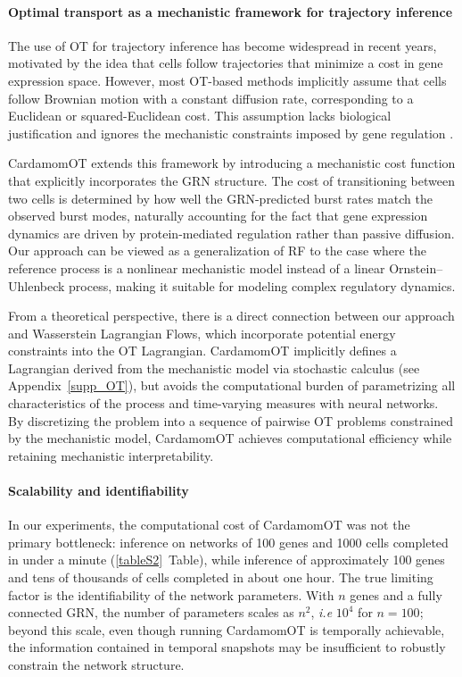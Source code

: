 \documentclass[a4paper, 11pt]{article}
\theoremstyle{plain}
\theoremstyle{remark}
\newcommand*{\firstreview}[1]{{\color{black}#1}}
\begin{document}
\paragraph{Optimal transport as a mechanistic framework for trajectory inference}
The use of \firstreview{OT} for trajectory inference has become widespread in recent years, motivated by the idea that cells follow trajectories that minimize a cost in gene expression space. However, most OT-based methods implicitly assume that cells follow Brownian motion with a constant diffusion rate, corresponding to a Euclidean or squared-Euclidean cost. This assumption lacks biological justification and ignores the mechanistic constraints imposed by gene regulation \cite{fournie2025cell}.

CardamomOT extends this framework by introducing a mechanistic cost function that explicitly incorporates the GRN structure. The cost of transitioning between two cells is determined by how well the GRN-predicted burst rates match the observed burst modes, naturally accounting for the fact that gene expression dynamics are driven by protein-mediated regulation rather than passive diffusion. Our approach can be viewed as a generalization of \firstreview{RF} to the case where the reference process is a nonlinear mechanistic model instead of a linear Ornstein–Uhlenbeck process, making it suitable for modeling complex regulatory dynamics.

From a theoretical perspective, there is a direct connection between our approach and Wasserstein Lagrangian Flows, which incorporate potential energy constraints into the OT Lagrangian. CardamomOT implicitly defines a Lagrangian derived from the mechanistic model via stochastic calculus (see Appendix~\ref{supp_OT}), but avoids the computational burden of parametrizing all characteristics of the process and time-varying measures with neural networks. By discretizing the problem into a sequence of pairwise OT problems constrained by the mechanistic model, CardamomOT achieves computational efficiency while retaining mechanistic interpretability.

\paragraph{Scalability and identifiability}
In our experiments, the computational cost of CardamomOT was not the primary bottleneck: inference on networks \firstreview{of 100 genes and 1000 cells completed in under a minute (\ref{tableS2}~Table), while inference of approximately 100 genes and} tens of thousands of cells completed in about one hour. The true limiting factor is the identifiability of the network parameters. With $n$ genes and a fully connected GRN, the number of parameters scales as $n^2$, \textit{i.e} $10^4$ for $n=100$; beyond this scale, \firstreview{even though running CardamomOT is temporally achievable,} the information contained in temporal snapshots may be insufficient to robustly constrain the network structure.
\end{document}
